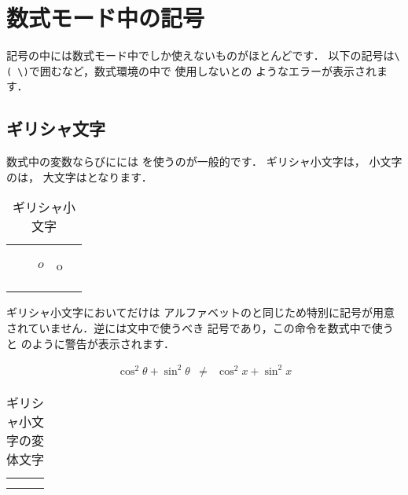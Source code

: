 \section{数式モード中の記号}%
%
記号の中には数式モード中でしか使えないものがほとんどです．
以下の記号は\verb+\( \)+で囲むなど，数式環境の中で
使用しないとの
ようなエラーが表示されます．


\subsection{ギリシャ文字}
数式中の変数ならびにには
を使うのが一般的です．%
ギリシャ小文字は，
小文字のは，%
%
大文字はとなります．
\begin{table}[htbp]
\begin{scenter}
\caption{ギリシャ小文字}
\begin{tabular}{LCCC}
   &     &     &      \\
    &   &     &  \\
   &    & $o$&o     &      \\
   &   &     &      \\
 &  &    &      \\
    &      &  &    \\
\end{tabular}
\end{scenter}
\end{table}
ギリシャ小文字においてだけは
アルファベットのと同じため特別に記号が用意
されていません．逆には文中で使うべき
記号であり，この命令を数式中で使うと
のように警告が表示されます．
%
\begin{InOut}
\begin{eqnarray*}
\cos^2\theta+\sin^2\theta &\neq&
   \cos^2x + \sin^2x 
\end{eqnarray*}
\end{InOut}
%
\begin{table}[htbp]
 \begin{scenter}
%
\caption{ギリシャ小文字の変体文字}
 \begin{tabular}{LCC}
  &  &  \\
      &  & \\
 \end{tabular}
 \end{scenter}
\end{table}
